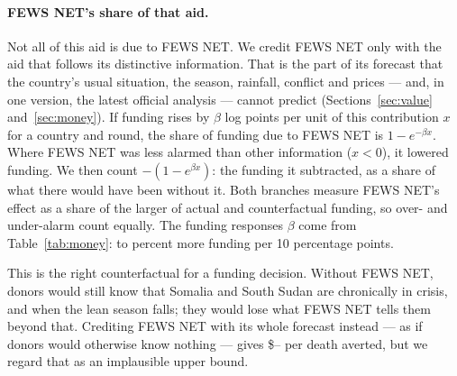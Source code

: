 \documentclass[11pt]{article}
\begin{document}
\begin{appendices}
\paragraph{FEWS NET's share of that aid.} Not all of this aid is due to FEWS NET. We credit FEWS NET only with the aid that follows its distinctive information. That is the part of its forecast that the country's usual situation, the season, rainfall, conflict and prices --- and, in one version, the latest official analysis --- cannot predict (Sections~\ref{sec:value} and~\ref{sec:money}). If funding rises by $\beta$ log points per unit of this contribution $x$ for a country and round, the share of funding due to FEWS NET is $1-e^{-\beta x}$. Where FEWS NET was less alarmed than other information ($x<0$), it lowered funding. We then count $-(1-e^{\beta x})$: the funding it subtracted, as a share of what there would have been without it. Both branches measure FEWS NET's effect as a share of the larger of actual and counterfactual funding, so over- and under-alarm count equally. The funding responses $\beta$ come from Table~\ref{tab:money}: \bcBetaOne{} to \bcBetaThree{} percent more funding per 10 percentage points.

This is the right counterfactual for a funding decision. Without FEWS NET, donors would still know that Somalia and South Sudan are chronically in crisis, and when the lean season falls; they would lose what FEWS NET tells them beyond that. Crediting FEWS NET with its whole forecast instead --- as if donors would otherwise know nothing --- gives \$\wholeLo{}--\wholeHi{} per death averted, but we regard that as an implausible upper bound.


\end{appendices}
\end{document}
